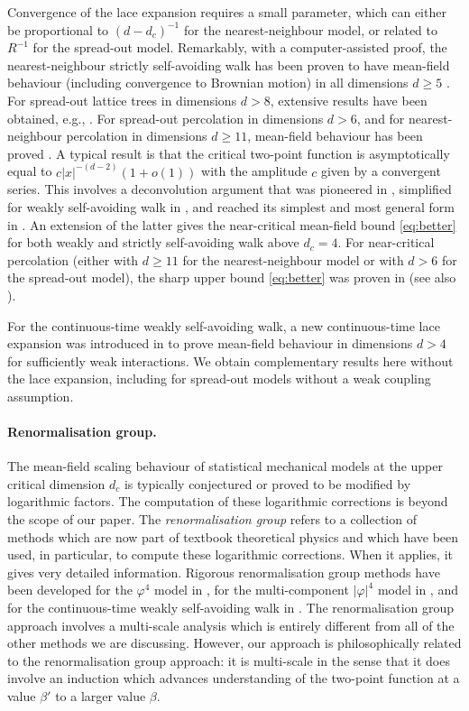\documentclass[11pt,a4paper]{article}
\numberwithin{equation}{section}
\theoremstyle{plain}
\theoremstyle{definition}
\newcommand\1{\mathds{1}}
\begin{document}
Convergence of the lace expansion requires a small parameter,
which can either be proportional to $(d-d_c)^{-1}$ for the nearest-neighbour model, or
related to $R^{-1}$ for the spread-out model.
Remarkably, with a computer-assisted proof,
the nearest-neighbour strictly self-avoiding walk has been proven to have mean-field
behaviour (including convergence to Brownian motion) in all dimensions $d \ge 5$ \cite{HS92a}.
For spread-out lattice trees in dimensions $d>8$, extensive results have
been obtained, e.g., \cite{HS90b,HS92c,DS98,CFHP23,LS25a}.
For spread-out percolation in dimensions $d>6$, and for nearest-neighbour
percolation in dimensions $d \ge 11$, mean-field behaviour has been proved   \cite{HS90a,FH17}.
A typical result is that the critical two-point function is asymptotically
equal to $c|x|^{-(d-2)}(1+o(1))$ with the amplitude $c$ given by a convergent
series.
This involves a deconvolution argument that was pioneered in \cite{HHS03,Hara08},
simplified for weakly self-avoiding walk in \cite{BHK18}, and reached its
simplest and most general form in
\cite{Slad22_lace,LS24a,LS26AIHP}.  An extension of the latter
gives the near-critical mean-field bound \eqref{eq:better} for both weakly \cite{Slad23_wsaw} and
strictly \cite{Liu25EJP} self-avoiding walk above $d_c=4$.
For near-critical percolation (either with $d \ge 11$ for the nearest-neighbour
model or with $d>6$ for the spread-out model), the sharp upper bound
\eqref{eq:better} was proven in \cite{HMS23} (see also \cite{CHS23,Vann22}).

For the continuous-time weakly self-avoiding walk, a new continuous-time lace expansion
was introduced in \cite{BHH21} to prove mean-field behaviour in dimensions $d>4$ for
sufficiently weak interactions.  We obtain complementary results here without
the lace expansion, including for spread-out models without a weak coupling
assumption.

\paragraph{Renormalisation group.}
The mean-field scaling behaviour of statistical mechanical models at the
upper critical dimension $d_c$ is typically conjectured or proved to be
modified by logarithmic factors.
The computation of these logarithmic corrections is beyond the scope of our paper.
The \emph{renormalisation group} \cite{WK74} refers
to a collection of methods which are now part of textbook theoretical
physics and which have been used, in particular,
 to compute these logarithmic corrections.  When it applies, it gives very
 detailed information.
Rigorous renormalisation group methods have been developed
for the $\varphi^4$ model in \cite{GK85,FMRS87,Hara87},
for the multi-component $|\varphi|^4$ model in \cite{BBS-phi4-log,ST-phi4,BBS-brief},
and for the continuous-time weakly self-avoiding walk in \cite{BBS-saw4-log,BBS-saw4}.
The renormalisation group approach involves a multi-scale analysis
which is entirely different from all of the other methods we are
discussing.  However, our approach is philosophically related to the renormalisation
group approach: it is multi-scale in the sense that it does involve an induction
which advances understanding of the two-point function at a value $\beta'$
to a larger value $\beta$.
\end{document}
